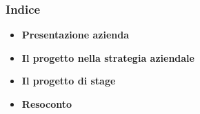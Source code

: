 \begin{frame}
\frametitle{Indice}
\begin{itemize}
\item \textbf{Presentazione azienda}
\item \textbf{Il progetto nella strategia aziendale}
\item \textbf{Il progetto di stage}
\item \textbf{Resoconto}
\end{itemize}
\end{frame}
